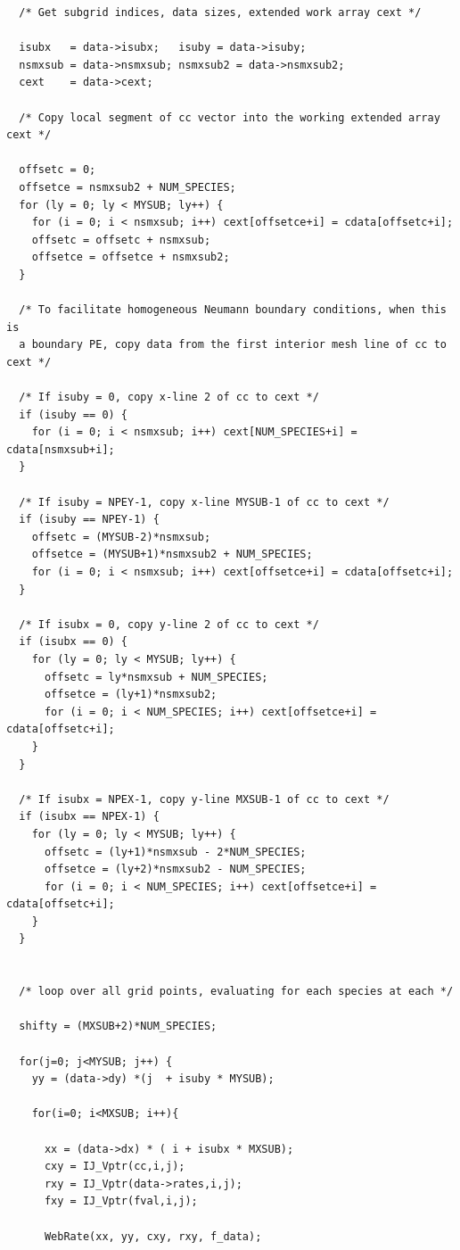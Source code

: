 \documentclass[11pt]{article}
\begin{document}
\begin{verbatim}
  /* Get subgrid indices, data sizes, extended work array cext */

  isubx   = data->isubx;   isuby = data->isuby;
  nsmxsub = data->nsmxsub; nsmxsub2 = data->nsmxsub2;
  cext    = data->cext;

  /* Copy local segment of cc vector into the working extended array cext */

  offsetc = 0;
  offsetce = nsmxsub2 + NUM_SPECIES;
  for (ly = 0; ly < MYSUB; ly++) {
    for (i = 0; i < nsmxsub; i++) cext[offsetce+i] = cdata[offsetc+i];
    offsetc = offsetc + nsmxsub;
    offsetce = offsetce + nsmxsub2;
  }

  /* To facilitate homogeneous Neumann boundary conditions, when this is
  a boundary PE, copy data from the first interior mesh line of cc to cext */

  /* If isuby = 0, copy x-line 2 of cc to cext */
  if (isuby == 0) {
    for (i = 0; i < nsmxsub; i++) cext[NUM_SPECIES+i] = cdata[nsmxsub+i];
  }

  /* If isuby = NPEY-1, copy x-line MYSUB-1 of cc to cext */
  if (isuby == NPEY-1) {
    offsetc = (MYSUB-2)*nsmxsub;
    offsetce = (MYSUB+1)*nsmxsub2 + NUM_SPECIES;
    for (i = 0; i < nsmxsub; i++) cext[offsetce+i] = cdata[offsetc+i];
  }

  /* If isubx = 0, copy y-line 2 of cc to cext */
  if (isubx == 0) {
    for (ly = 0; ly < MYSUB; ly++) {
      offsetc = ly*nsmxsub + NUM_SPECIES;
      offsetce = (ly+1)*nsmxsub2;
      for (i = 0; i < NUM_SPECIES; i++) cext[offsetce+i] = cdata[offsetc+i];
    }
  }

  /* If isubx = NPEX-1, copy y-line MXSUB-1 of cc to cext */
  if (isubx == NPEX-1) {
    for (ly = 0; ly < MYSUB; ly++) {
      offsetc = (ly+1)*nsmxsub - 2*NUM_SPECIES;
      offsetce = (ly+2)*nsmxsub2 - NUM_SPECIES;
      for (i = 0; i < NUM_SPECIES; i++) cext[offsetce+i] = cdata[offsetc+i];
    }
  }


  /* loop over all grid points, evaluating for each species at each */

  shifty = (MXSUB+2)*NUM_SPECIES;

  for(j=0; j<MYSUB; j++) {
    yy = (data->dy) *(j  + isuby * MYSUB);

    for(i=0; i<MXSUB; i++){

      xx = (data->dx) * ( i + isubx * MXSUB);
      cxy = IJ_Vptr(cc,i,j);
      rxy = IJ_Vptr(data->rates,i,j);
      fxy = IJ_Vptr(fval,i,j);

      WebRate(xx, yy, cxy, rxy, f_data);


\end{verbatim}
\end{document}
